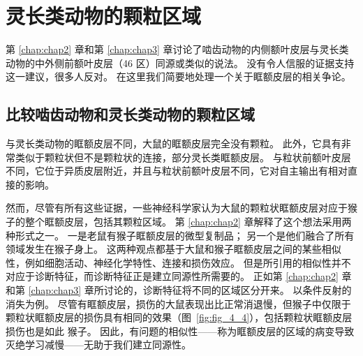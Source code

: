 \section{灵长类动物的颗粒区域}

第 \ref{chap:chap2} 章和第 \ref{chap:chap3} 章讨论了啮齿动物的内侧额叶皮层与灵长类动物的中外侧前额叶皮层（46 区）同源或类似的说法。
没有令人信服的证据支持这一建议，很多人反对。
在这里我们简要地处理一个关于眶额皮层的相关争论。\par



\subsection{比较啮齿动物和灵长类动物的颗粒区域}

与灵长类动物的眶额皮层不同，大鼠的眶额皮层完全没有颗粒。
此外，它具有非常类似于颗粒状但不是颗粒状的连接，部分灵长类眶额皮层。
与粒状前额叶皮层不同，它位于异质皮层附近，并且与粒状前额叶皮层不同，它对自主输出有相对直接的影响。\par


然而，尽管有所有这些证据，一些神经科学家认为大鼠的颗粒状眶额皮层对应于猴子的整个眶额皮层，包括其颗粒区域\cite{uylings2003rats,seamans2008comparing,schoenbaum2009new}。
第 \ref{chap:chap2} 章解释了这个想法采用两种形式之一。
一是老鼠有猴子眶额皮层的微型复制品；
另一个是他们融合了所有领域发生在猴子身上。
这两种观点都基于大鼠和猴子眶额皮层之间的某些相似性，例如细胞活动、神经化学特性、连接和损伤效应。
但是所引用的相似性并不对应于诊断特征，而诊断特征正是建立同源性所需要的。
正如第 \ref{chap:chap2} 章和第 \ref{chap:chap3} 章所讨论的，诊断特征将不同的区域区分开来。
以条件反射的消失为例。
尽管有眶额皮层，损伤的大鼠表现出比正常消退慢\cite{kolb1974double}，但猴子中仅限于颗粒状眶额皮层的损伤具有相同的效果\cite{izquierdo2005comparison}（图~\ref{fig:fig_4_4}），包括颗粒状眶额皮层损伤也是如此 猴子\cite{butter1969perseveration}。
因此，有问题的相似性——称为眶额皮层的区域的病变导致灭绝学习减慢——无助于我们建立同源性。\par


